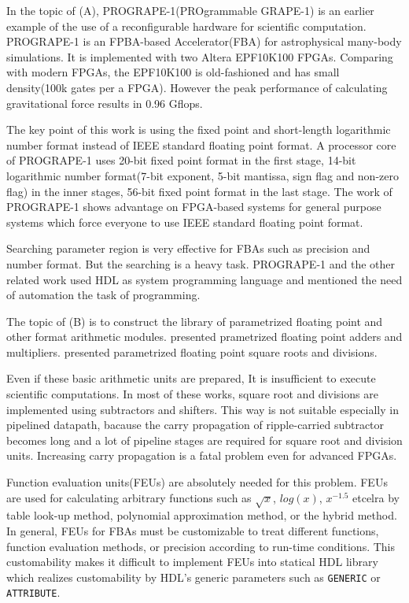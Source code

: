 \documentclass{llncs}
\begin{document}
In the topic of (A), PROGRAPE-1(PROgrammable GRAPE-1)\cite{HFKM00} is
an earlier example of the use of a reconfigurable hardware for
scientific computation.  PROGRAPE-1 is an FPBA-based Accelerator(FBA)
for astrophysical many-body simulations. It is implemented with two
Altera EPF10K100 FPGAs. Comparing with modern FPGAs, the EPF10K100 is
old-fashioned and has small density(100k gates per a FPGA). However the
peak performance of calculating gravitational force results in 0.96
Gflops. 

The key point of this work is using the fixed point and short-length
logarithmic number format instead of IEEE standard floating point
format. A processor core of PROGRAPE-1 uses 20-bit fixed point format
in the first stage, 14-bit logarithmic number format(7-bit exponent,
5-bit mantissa, sign flag and non-zero flag) in the inner stages,
56-bit fixed point format in the last stage.  The work of PROGRAPE-1
shows advantage on FPGA-based systems for general purpose systems
which force everyone to use IEEE standard floating point format.

Searching parameter region is very effective for FBAs such as
precision and number format. But the searching is a heavy
task. PROGRAPE-1 and the other related work\cite{LKM02}\cite{SS03}\cite{AKEDC04}
used HDL as system programming language and mentioned the need of
automation the task of programming.

The topic of (B) is to construct the library of parametrized floating
point and other format arithmetic modules.  \cite{JL01}\cite{LCCN03}
presented prametrized floating point adders and
multipliers. \cite{LKM02}\cite{WN04} presented parametrized floating
point square roots and divisions. 

Even if these basic arithmetic units are prepared, It is
insufficient to execute scientific computations.  In most of these
works, square root and divisions are implemented using subtractors and
shifters. This way is not suitable especially in pipelined datapath,
bacause the carry propagation of ripple-carried subtractor becomes long and
a lot of pipeline stages are required for square root and division units.
Increasing carry propagation is a fatal problem even for advanced FPGAs.

Function evaluation units(FEUs) are absolutely needed for this
problem.  FEUs are used for calculating arbitrary functions such as
$\sqrt{x}$, $log(x)$, $x^{-1.5}$ etcelra by table look-up method,
polynomial approximation method, or the hybrid
method\cite{FO01}\cite{M97}.  In general, FEUs for FBAs must be
customizable to treat different functions, function evaluation
methods, or precision according to run-time conditions.  This
customability makes it difficult to implement FEUs into statical HDL
library which realizes customability by HDL's
generic parameters such as \verb|GENERIC| or \verb|ATTRIBUTE|.
\end{document}
